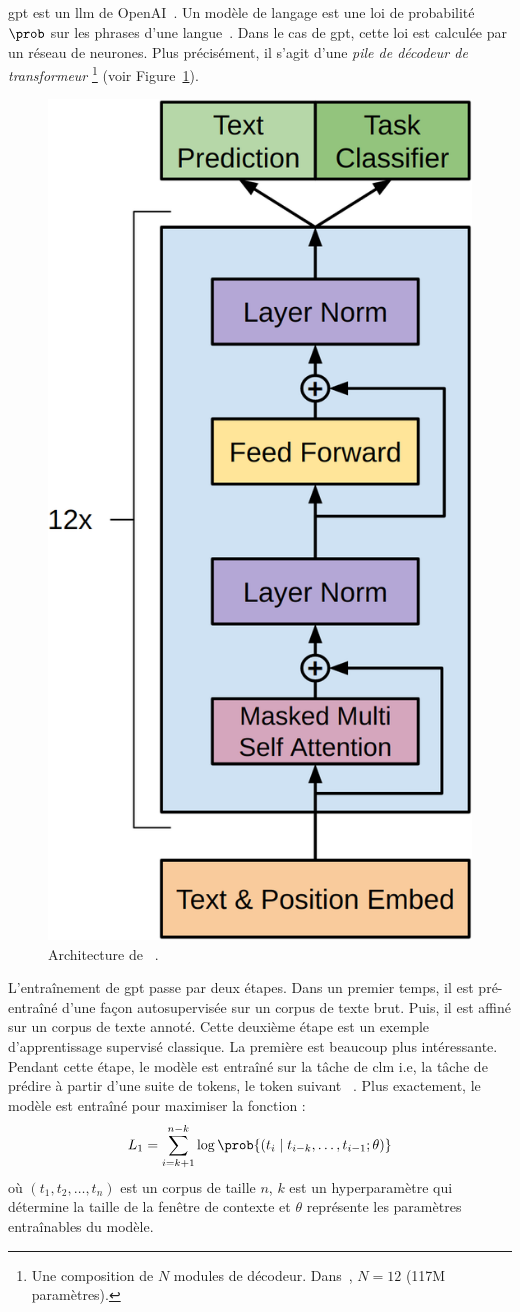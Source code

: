 \subsection{}

\Gls{gpt} est un \gls{llm} de OpenAI~\cite{Radford_Narasimhan_Salimans_Sutskever}.
Un modèle de langage est une loi de probabilité \(\prob\) sur les phrases d'une langue~\cite{routledge}.
Dans le cas de \gls{gpt}, cette loi est calculée par un réseau de neurones.
Plus précisément, il s'agit d'une \emph{pile de décodeur de transformeur}%
\footnote{%
    Une composition de \(N\) modules de décodeur. 
    Dans~\cite{Radford_Narasimhan_Salimans_Sutskever}, \(N=12\)
    (117M paramètres).
} (voir Figure~\ref{fig.gpt}).

\begin{figure}[hbt]
    \centering
    \includegraphics[height=.5\linewidth]{assets/images/gpt.png}
    \caption[Architecture de .]%
    {Architecture de ~\cite{Radford_Narasimhan_Salimans_Sutskever}.}
    \label{fig.gpt}
\end{figure}

L'entraînement de \gls{gpt} passe par deux étapes.
Dans un premier temps, il est pré-entraîné d'une façon autosupervisée sur un corpus de texte brut.
Puis, il est affiné sur un corpus de texte annoté.
Cette deuxième étape est un exemple d'apprentissage supervisé classique.
La première est beaucoup plus intéressante.
Pendant cette étape, le modèle est entraîné sur la tâche de \gls{clm}
i.e, la tâche de prédire à partir d'une suite de tokens, le token suivant%
~\cite{Radford_Narasimhan_Salimans_Sutskever}.
Plus exactement, le modèle est entraîné pour maximiser la fonction :
\begin{equation}
    \label{eq.gpt-pretrain-loss}
    L_1=\sum_{i=k+1}^{n-k} \log\prob{\left(t_i \mid t_{i-k}, \ldots, t_{i-1} ; \theta\right)}
\end{equation}
où \(\left(t_1, t_2, \ldots, t_n\right)\) est un corpus de taille \(n\), 
\(k\) est un hyperparamètre qui détermine la taille de la fenêtre de contexte
et \(\theta\) représente les paramètres entraînables du modèle.


